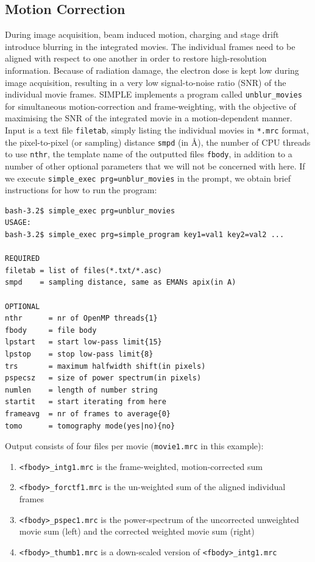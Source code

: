 \documentclass[a4paper,11pt]{article}
\newcommand{\prgname}[1]{\textcolor{NavyBlue}{\texttt{#1}}}
\begin{document}
\subsection{Motion Correction}
During image acquisition, beam induced motion, charging and stage drift introduce blurring in the integrated movies. The individual frames need to be aligned with respect to one another in order to restore high-resolution information. Because of radiation damage, the electron dose is kept low during image acquisition, resulting in a very low signal-to-noise ratio (SNR) of the individual movie frames. SIMPLE implements a program called \prgname{unblur\_movies} for simultaneous motion-correction and frame-weighting, with the objective of maximising the SNR of the integrated movie in a motion-dependent manner. Input is a text file \texttt{filetab}, simply listing the individual movies in \texttt{*.mrc} format, the pixel-to-pixel (or sampling) distance \texttt{smpd} (in \AA{}), the number of CPU threads to use \texttt{nthr}, the template name of the outputted files \texttt{fbody}, in addition to a number of other optional parameters that we will not be concerned with here. If we execute \texttt{simple\_exec prg=unblur\_movies} in the prompt, we obtain brief instructions for how to run the program:
\begin{verbatim}
bash-3.2$ simple_exec prg=unblur_movies
USAGE:
bash-3.2$ simple_exec prg=simple_program key1=val1 key2=val2 ...

REQUIRED
filetab = list of files(*.txt/*.asc)
smpd    = sampling distance, same as EMANs apix(in A)

OPTIONAL
nthr      = nr of OpenMP threads{1}
fbody     = file body
lpstart   = start low-pass limit{15}
lpstop    = stop low-pass limit{8}
trs       = maximum halfwidth shift(in pixels)
pspecsz   = size of power spectrum(in pixels)
numlen    = length of number string
startit   = start iterating from here
frameavg  = nr of frames to average{0}
tomo      = tomography mode(yes|no){no}
\end{verbatim}
Output consists of four files per movie (\texttt{movie1.mrc} in this example):
\begin{enumerate}
\item \texttt{<fbody>\_intg1.mrc} is the frame-weighted, motion-corrected sum
\item \texttt{<fbody>\_forctf1.mrc} is the un-weighted sum of the aligned individual frames
\item \texttt{<fbody>\_pspec1.mrc} is the power-spectrum of the uncorrected unweighted movie sum (left) and the corrected weighted movie sum (right)
\item \texttt{<fbody>\_thumb1.mrc} is a down-scaled version of  \texttt{<fbody>\_intg1.mrc}
\end{enumerate}
\end{document}
